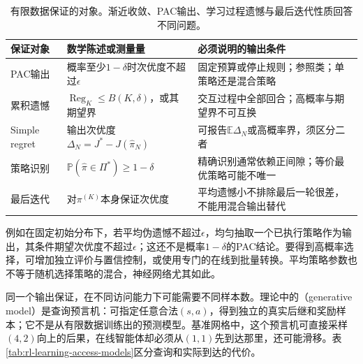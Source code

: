 \begin{table}[t]
  \centering
  \small
  \begin{tabularx}{\linewidth}{>{\raggedright\arraybackslash}p{24mm} >{\raggedright\arraybackslash}X >{\raggedright\arraybackslash}X}
    \toprule
    保证对象 & 数学陈述或测量量 & 必须说明的输出条件 \\
    \midrule
    PAC输出 & 概率至少$1-\delta$时次优度不超过$\epsilon$ & 固定预算或停止规则；参照类；单策略还是混合策略 \\
    累积遗憾 & $\operatorname{Reg}_K\leq B(K,\delta)$，或其期望界 & 交互过程中全部回合；高概率与期望界不可互换 \\
    Simple regret & 输出次优度$\Delta_N=J^*-J(\widehat\pi_N)$ & 可报告$\mathbb E\Delta_N$或高概率界，须区分二者 \\
    策略识别 & $\mathbb P(\widehat\pi\in\Pi^*)\geq1-\delta$ & 精确识别通常依赖正间隙；等价最优策略可能不唯一 \\
    最后迭代 & 对$\pi^{(K)}$本身保证次优度 & 平均遗憾小不排除最后一轮很差，不能用混合输出替代 \\
    \bottomrule
  \end{tabularx}
  \caption{有限数据保证的对象。渐近收敛、PAC输出、学习过程遗憾与最后迭代性质回答不同问题。}
  \label{tab:rl-learning-guarantee-objects}
\end{table}

例如在固定初始分布下，若平均伪遗憾不超过$\epsilon$，均匀抽取一个已执行策略作为输出，其条件期望次优度不超过$\epsilon$；这还不是概率$1-\delta$的PAC结论。要得到高概率选择，可增加独立评价与置信控制，或使用专门的在线到批量转换。平均策略参数也不等于随机选择策略的混合，神经网络尤其如此。

同一个输出保证，在不同访问能力下可能需要不同样本数。理论中的（generative model）是查询预言机：可指定任意合法$(s,a)$，得到独立的真实后继和奖励样本；它不是从有限数据训练出的预测模型。基准网格中，这个预言机可直接采样$(4,2)$向上的后果，在线智能体却必须从$(1,1)$先到达那里，还可能滑移。表\ref{tab:rl-learning-access-models}区分查询和实际到达的代价。

